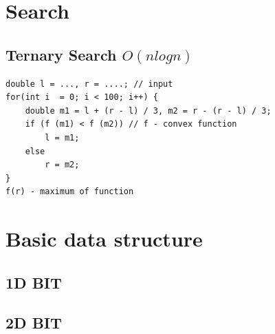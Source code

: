 \documentclass[10pt,oneside]{article}
\begin{document}
\begin{landscape}
\begin{multicols}{2}




\section{Search}

\subsection{Ternary Search $O(nlogn)$}

\begin{verbatim}
double l = ..., r = ....; // input
for(int i  = 0; i < 100; i++) {
    double m1 = l + (r - l) / 3, m2 = r - (r - l) / 3;
    if (f (m1) < f (m2)) // f - convex function
        l = m1;
    else
        r = m2;
}
f(r) - maximum of function
\end{verbatim}




\section{Basic data structure}

\subsection{1D BIT}


\subsection{2D BIT}


\end{multicols}
\end{landscape}
\end{document}
